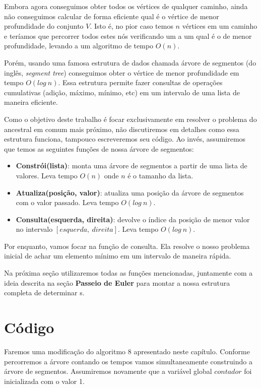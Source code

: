 Embora agora conseguimos obter todos os vértices de qualquer caminho, ainda não conseguimos calcular de forma eficiente qual é o vértice de menor profundidade do conjunto $V$. Isto é, no pior caso temos $n$ vértices em um caminho e teríamos que percorrer todos estes nós verificando um a um qual é o de menor profundidade, levando a um algoritmo de tempo $O(n)$.

Porém, usando uma famosa estrutura de dados chamada árvore de segmentos (do inglês, \textit{segment tree}) conseguimos obter o vértice de menor profundidade em tempo $O(log\ n)$. Essa estrutura permite fazer consultas de operações cumulativas (adição, máximo, mínimo, etc) em um intervalo de uma lista de maneira eficiente.

Como o objetivo deste trabalho é focar exclusivamente em resolver o problema do ancestral em comum mais próximo, não discutiremos em detalhes como essa estrutura funciona, tampouco escreveremos seu código. Ao invés, assumiremos que temos as seguintes funções de nossa árvore de segmentos:

\begin{itemize}
    \item \textbf{Constrói(lista)}: monta uma árvore de segmentos a partir de uma lista de valores. Leva tempo $O(n)$ onde $n$ é o tamanho da lista.
    \item \textbf{Atualiza(posição, valor)}: atualiza uma posição da árvore de segmentos com o valor passado. Leva tempo $O(log\ n)$.
    \item \textbf{Consulta(esquerda, direita)}: devolve o índice da posição de menor valor no intervalo $[esquerda,\ direita]$. Leva tempo $O(log\ n)$.
\end{itemize}

Por enquanto, vamos focar na função de consulta. Ela resolve o nosso problema inicial de achar um elemento mínimo em um intervalo de maneira rápida.

Na próxima seção utilizaremos todas as funções mencionadas, juntamente com a ideia descrita na seção \textbf{Passeio de Euler} para montar a nossa estrutura completa de determinar \LCA s.

\section{Código}

Faremos uma modificação do algoritmo 8 apresentado neste capítulo. Conforme percorremos a árvore contando os tempos vamos simultaneamente construindo a árvore de segmentos. Assumiremos novamente que a variável global $contador$ foi inicializada com o valor 1.

